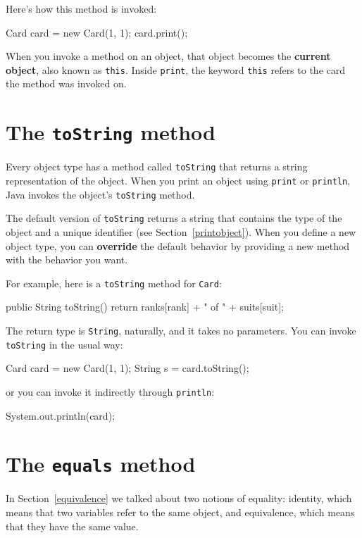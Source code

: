 Here's how this method is invoked:

\begin{code}
    Card card = new Card(1, 1);
    card.print();
\end{code}

When you invoke a method on an object, that object becomes the {\bf
current object}, also known as {\tt this}.  Inside {\tt print},
the keyword {\tt this} refers to the card the method was invoked on.


\section{The {\tt toString} method}

Every object type has a method called {\tt toString} that returns a
string representation of the object.  When you print an object using
{\tt print} or {\tt println}, Java invokes the object's {\tt toString}
method.

The default
version of {\tt toString} returns a string that contains the type
of the object and a unique identifier (see Section~\ref{printobject}).
When you define a new object
type, you can {\bf override} the default behavior by providing a
new method with the behavior you want.

For example, here is a {\tt toString} method for {\tt Card}:

\begin{code}
public String toString() {
    return ranks[rank] + " of " + suits[suit];
}
\end{code}
%
The return type is {\tt String}, naturally,
and it takes no parameters.  You can invoke {\tt toString} in
the usual way:

\begin{code}
    Card card = new Card(1, 1);
    String s = card.toString();
\end{code}
%
or you can invoke it indirectly through {\tt println}:

\begin{code}
    System.out.println(card);
\end{code}


\section{The {\tt equals} method}

In Section~\ref{equivalence} we talked about two notions of equality:
identity, which means that two variables refer to the same
object, and equivalence, which means that they have the same
value.


